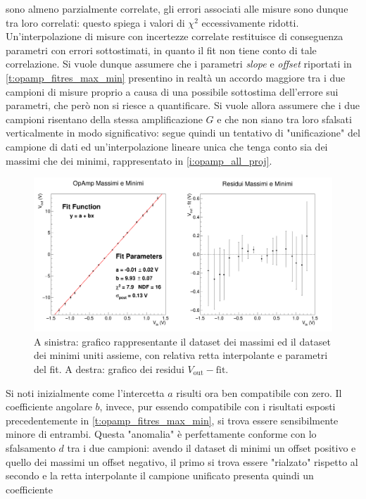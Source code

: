 \documentclass[a4paper,11pt]{article} %
\begin{document}
sono almeno parzialmente correlate, gli errori associati alle misure sono dunque tra loro correlati: questo spiega i
valori di $\chi^2$ eccessivamente ridotti. Un'interpolazione di misure con incertezze correlate restituisce di
conseguenza parametri con errori sottostimati, in quanto il fit non tiene conto di tale correlazione. Si vuole dunque
assumere che i parametri \textit{slope} e \textit{offset} riportati in \autoref{t:opamp_fitres_max_min} presentino in
realtà un accordo maggiore tra i due campioni di misure proprio a causa di una possibile sottostima dell'errore sui
parametri, che però non si riesce a quantificare. Si vuole allora assumere che i due campioni risentano della stessa
amplificazione $G$ e che non siano tra loro sfalsati verticalmente in modo significativo: segue quindi un tentativo di
"unificazione" del campione di dati ed un'interpolazione lineare unica che tenga conto sia dei massimi che dei minimi,
rappresentato in \autoref{i:opamp_all_proj}. 
\begin{figure}[H]
	\centering
	\includegraphics[width=15cm]{../Plots/Report_Plots/opamp_plot_all_projected.png}
	\caption{\small A sinistra: grafico rappresentante il dataset dei massimi ed il dataset dei minimi uniti assieme, 
	con relativa retta interpolante e parametri del fit. A destra: grafico dei residui $V_{\text{out}}-\text{fit}$.}
	\label{i:opamp_all_proj}
\end{figure}
\noindent Si noti inizialmente come l'intercetta $a$ risulti ora ben compatibile con zero. Il coefficiente angolare $b$,
invece, pur essendo compatibile con i risultati esposti precedentemente in \autoref{t:opamp_fitres_max_min}, si trova
essere sensibilmente minore di entrambi. Questa "anomalia" è perfettamente conforme con lo sfalsamento $d$ tra i due
campioni: avendo il dataset di minimi un offset positivo e quello dei massimi un offset negativo, il primo si trova
essere "rialzato" rispetto al secondo e la retta interpolante il campione unificato presenta quindi un coefficiente
\end{document}
